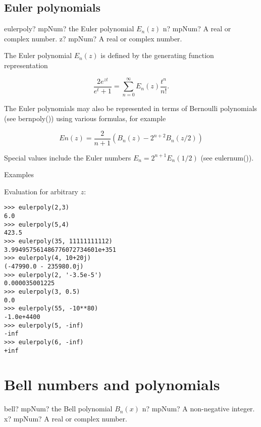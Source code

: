\subsection{Euler polynomials}

\begin{mpFunctionsExtract}
	\mpFunctionTwo
	{eulerpoly? mpNum? the Euler polynomial $E_n(z)$}
	{n? mpNum? A real or complex number.}
	{z? mpNum? A real or complex number.}		
\end{mpFunctionsExtract}

\vpara
The Euler polynomial $E_n(z)$ is defined by the generating function representation

\begin{equation}
\frac{2e^{zt}}{e^t +1} = \sum_{n=0}^{\infty} E_n(z) \frac{t^n}{n!}.
\end{equation}

The Euler polynomials may also be represented in terms of Bernoulli polynomials (see bernpoly()) using various formulas, for example

\begin{equation}
En(z) = \frac{2}{n+1} \left(B_n(z) - 2^{n+2} B_n(z/2)   \right)
\end{equation}

Special values include the Euler numbers $E_n=2^{n+1}E_n(1/2)$ (see eulernum()).

Examples

Evaluation for arbitrary $z$:

\begin{lstlisting}
>>> eulerpoly(2,3)
6.0
>>> eulerpoly(5,4)
423.5
>>> eulerpoly(35, 11111111112)
3.994957561486776072734601e+351
>>> eulerpoly(4, 10+20j)
(-47990.0 - 235980.0j)
>>> eulerpoly(2, '-3.5e-5')
0.000035001225
>>> eulerpoly(3, 0.5)
0.0
>>> eulerpoly(55, -10**80)
-1.0e+4400
>>> eulerpoly(5, -inf)
-inf
>>> eulerpoly(6, -inf)
+inf
\end{lstlisting}




\newpage
\section{Bell numbers and polynomials}


\begin{mpFunctionsExtract}
	\mpFunctionTwo
	{bell? mpNum? the Bell polynomial $B_n(x)$}
	{n? mpNum? A non-negative integer.}
	{x? mpNum? A real or complex number.}		
\end{mpFunctionsExtract}

